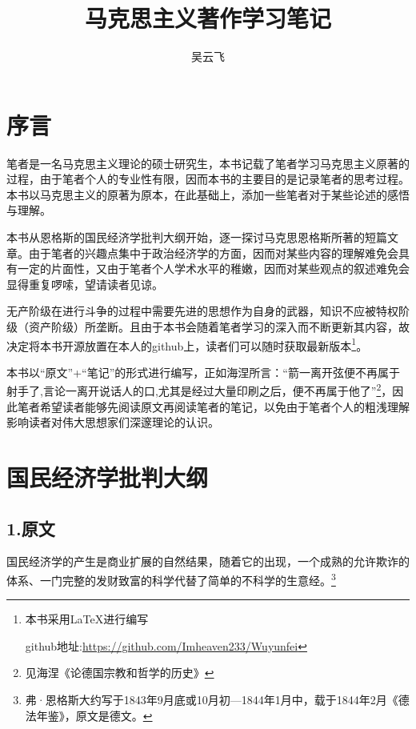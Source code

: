 \documentclass[a4paper,twoside,12pt]{ctexart}
\title{马克思主义著作学习笔记}
\author{吴云飞}
\date{}
\begin{document}
\maketitle

\newpage

\tableofcontents

\newpage

\section{序言}
\begin{adjustwidth}{2em}{2em}
\qquad\fangsong 笔者是一名马克思主义理论的硕士研究生，本书记载了笔者学习马克思主义原著的过程，由于笔者个人的专业性有限，因而本书的主要目的是记录笔者的思考过程。本书以马克思主义的原著为原本，在此基础上，添加一些笔者对于某些论述的感悟与理解。

本书从恩格斯的国民经济学批判大纲开始，逐一探讨马克思恩格斯所著的短篇文章。由于笔者的兴趣点集中于政治经济学的方面，因而对某些内容的理解难免会具有一定的片面性，又由于笔者个人学术水平的稚嫩，因而对某些观点的叙述难免会显得重复啰嗦，望请读者见谅。

无产阶级在进行斗争的过程中需要先进的思想作为自身的武器，知识不应被特权阶级（资产阶级）所垄断。且由于本书会随着笔者学习的深入而不断更新其内容，故决定将本书开源放置在本人的github上，读者们可以随时获取最新版本\footnote{本书采用LaTeX进行编写

\quad github地址:\url{https://github.com/Imheaven233/Wuyunfei}}。

本书以“原文”+“笔记”的形式进行编写，正如海涅所言：“箭一离开弦便不再属于射手了,言论一离开说话人的口,尤其是经过大量印刷之后，便不再属于他了”\footnote{见海涅《论德国宗教和哲学的历史》}，因此笔者希望读者能够先阅读原文再阅读笔者的笔记，以免由于笔者个人的粗浅理解影响读者对伟大思想家们深邃理论的认识。

\end{adjustwidth}

\newpage

\section{国民经济学批判大纲}

\subsection{1.原文}

国民经济学的产生是商业扩展的自然结果，随着它的出现，一个成熟的允许欺诈的体系、一门完整的发财致富的科学代替了简单的不科学的生意经。\footnote{弗·恩格斯大约写于1843年9月底或10月初—1844年1月中，载于1844年2月《德法年鉴》，原文是德文。}
\end{document}
